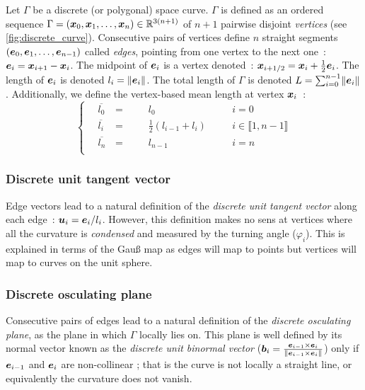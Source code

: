 Let $\Gamma$ be a discrete (or polygonal) space curve. $\Gamma$ is defined as an ordered sequence $\Gamma = (\boldsymbol{x}_0,  \boldsymbol{x}_1, \ldots, \boldsymbol{x}_n) \in \mathbb{R}^{3(n+1)}$ of $n+1$ pairwise disjoint \emph{vertices} (see \cref{fig:discrete_curve}). Consecutive pairs of vertices define $n$ straight segments $(\boldsymbol{e}_0,  \boldsymbol{e}_1, \ldots, \boldsymbol{e}_{n-1})$ called \emph{edges}, pointing from one vertex to the next one~: $\boldsymbol{e}_i = \boldsymbol{x}_{i+1} - \boldsymbol{x}_{i}$. The midpoint of $\boldsymbol{e}_i$ is a vertex denoted~: $\boldsymbol{x}_{i+1/2} = \boldsymbol{x}_{i} + \frac{1}{2}\boldsymbol{e}_{i}$. The length of $\boldsymbol{e}_i$ is denoted $l_i = \lVert\boldsymbol{e}_i\rVert$. The total length of $\Gamma$ is denoted $L = \sum_{i=0}^{n-1} \lVert\boldsymbol{e}_i\rVert$. Additionally, we define the vertex-based mean length at vertex $\boldsymbol{x}_i$~: 
\begin{equation}
	\left\{
	\begin{alignedat}{4}
		\,	&\overbar{l_0} 		& = &\,	&& l_0					&\quad 	&i = 0		\\
			&\overbar{l_i}		& = &	&& \frac{1}{2}(l_{i-1} + l_i)		&		&i \in \llbracket 1, n-1 \rrbracket	\\
			&\overbar{l_n} 	\,	& = &	&& l_{n-1} 				&		&i = n		\\
	\end{alignedat}
	\right.
\end{equation}

\subsubsection{Discrete unit tangent vector}\label{sec:tangent_edge}
Edge vectors lead to a natural definition of the \emph{discrete unit tangent vector} along each edge~: $\boldsymbol{u}_i = \boldsymbol{e}_i / l_i$. However, this definition makes no sens at vertices where all the curvature is \emph{condensed} and measured by the turning angle ($\varphi_i$). This is explained in terms of the Gau{\ss} map as edges will map to points but vertices will map to curves on the unit sphere.

\subsubsection{Discrete osculating plane}
Consecutive pairs of edges lead to a natural definition of the \emph{discrete osculating plane}, as the plane in which $\Gamma$ locally lies on. This plane is well defined by its normal vector known as the \emph{discrete unit binormal vector} ($\boldsymbol{b}_i = \frac{\boldsymbol{e}_{i-1} \times \boldsymbol{e}_{i}}{\lVert\boldsymbol{e}_{i-1} \times \boldsymbol{e}_{i}\rVert}$) only if $\boldsymbol{e}_{i-1}$ and $\boldsymbol{e}_{i}$ are non-collinear ; that is the curve is not locally a straight line, or equivalently the curvature does not vanish.

